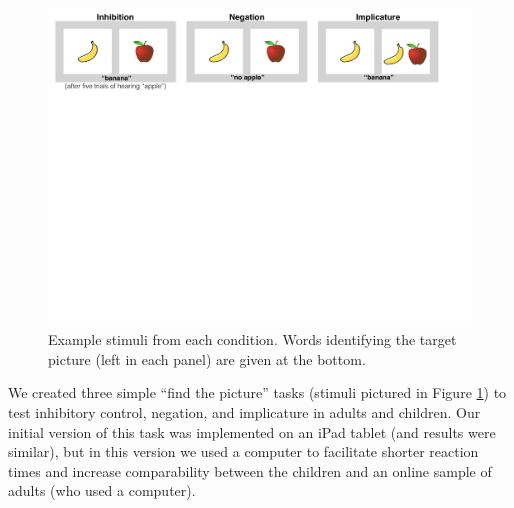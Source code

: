 \documentclass[man, noapacite]{apa2}
\newcommand{\aen}[1]{\textcolor{DarkOrange}{[aen: #1]}}
\begin{document}
\begin{figure}[t!]
\begin{centering}
\includegraphics[width=\textwidth]{figures/stimuli.pdf}
\caption{\label{fig:stimuli} Example stimuli from each condition. Words identifying the target picture (left in each panel) are given at the bottom.}
\end{centering}
\end{figure}

We created three simple ``find the picture'' tasks (stimuli pictured in Figure \ref{fig:stimuli}) to test inhibitory control, negation, and implicature in adults and children. Our initial version of this task was implemented on an iPad tablet (and results were similar), but in this version we used a computer to facilitate shorter reaction times and increase comparability between the children and an online sample of adults (who used a computer).

\end{document}
